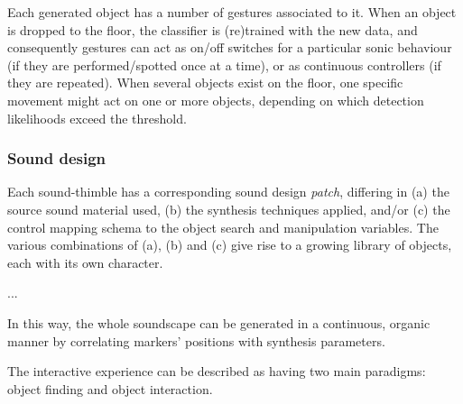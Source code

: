 \documentclass{nime-alternate}
\begin{document}
Each generated object has a number of gestures associated to it. When an object is dropped to the floor, the classifier is (re)trained with the new data, and consequently gestures can act as on/off switches for a particular sonic behaviour (if they are performed/spotted once at a time), or as continuous controllers (if they are repeated). When several objects exist on the floor, one specific movement might act on one or more objects, depending on which detection likelihoods exceed the threshold. 


\subsubsection{Sound design}

Each sound-thimble has a corresponding sound design \textit{patch}, differing in (a) the source sound material used, (b) the synthesis techniques applied, and/or (c) the control mapping schema to the object search and manipulation variables. The various combinations of (a), (b) and (c) give rise to a growing library of objects, each with its own character.



...

In this way, the whole soundscape can be generated in a continuous, organic manner by correlating markers’ positions with synthesis parameters. 

The interactive experience can be described as having two main paradigms: object finding and object interaction. 
\end{document}
